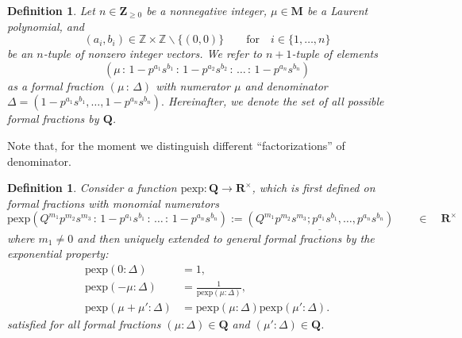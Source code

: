 \documentclass{amsart}
\newtheorem{definition}[theorem]{Definition}
\begin{document}
\begin{definition}
Let $n\in\mathbf Z_{\geq0}$ be a nonnegative integer, $\mu\in\mathbf M$ be a Laurent polynomial, and
\begin{equation*}
    (a_i,b_i)\in\mathbb Z\times\mathbb Z\backslash\{(0,0)\}\qquad\textrm{for}\quad i\in\{1,\dots,n\}
\end{equation*}
be an $n$-tuple of nonzero integer vectors. We refer to $n+1$-tuple of elements
\begin{equation*}
\left(\mu\,\mathbf{:}\,1-p^{a_1}s^{b_1}\,\mathbf{:}\,1-p^{a_2}s^{b_2}\,\mathbf{:}\,\dots\,\mathbf{:}\,1-p^{a_n}s^{b_n}\right)
\end{equation*}
as a formal fraction $(\mu\,\mathbf{:}\,\Delta)$ with numerator $\mu$ and denominator $\Delta=(1-p^{a_1}s^{b_1},\dots,1-p^{a_n}s^{b_n}).$ Hereinafter, we denote the set of all possible formal fractions by $\mathbf Q$.
\label{def:FormalFraction}
\end{definition}
Note that, for the moment we distinguish different ``factorizations'' of denominator.

\begin{definition}
Consider a function $\mathrm{pexp}:\mathbf Q\rightarrow\mathbf R^\times$, which is first defined on formal fractions with monomial numerators
\begin{equation}
\mathrm{pexp}\left(Q^{m_1}p^{m_2}s^{m_3}\,\mathbf{:}\, 1-p^{a_1}s^{b_1}\,\mathbf{:}\,\dots\,\mathbf{:}\,1-p^{a_n}s^{b_n}\right):=\underline{(Q^{m_1}p^{m_2}s^{m_3};p^{a_1}s^{b_1},\dots,p^{a_n}s^{b_n})}\qquad\in\quad\mathbf R^\times
\label{eq:pexpFormalFractionsMonomialDefinition}
\end{equation}
where $m_1\neq0$ and then uniquely extended to general formal fractions by the exponential property:
\begin{subequations}
\begin{align}
\mathrm{pexp}(0:\Delta)&=1,\\
\mathrm{pexp}(-\mu:\Delta)&=\frac1{\mathrm{pexp}(\mu:\Delta)},\\
\mathrm{pexp}(\mu+\mu':\Delta)&=\mathrm{pexp}(\mu:\Delta)\mathrm{pexp}(\mu':\Delta).
\label{eq:pexpFormalFractionsAdditivity}
\end{align}
\label{eq:ExponentialPropertyFormalFractions}
\end{subequations}
satisfied for all formal fractions $(\mu:\Delta)\in\mathbf Q$ and $(\mu':\Delta)\in\mathbf Q$.
\label{def:PExpFormalFraction}
\end{definition}
\end{document}
